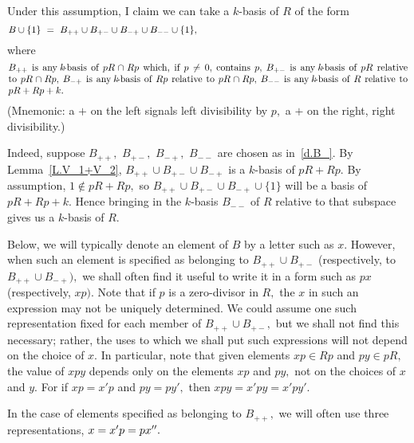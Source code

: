 \documentclass{amsart}
\begin{document}
Under this assumption,
I claim we can take a $\!k\!$-basis of $R$ of the form
\begin{equation}\begin{minipage}[c]{35pc}\label{d.B=}
$B\cup\{1\}\ =\ B_{++}\cup B_{+-} \cup B_{-+}\cup B_{--}\cup \{1\},$
\end{minipage}\end{equation}
where
\begin{equation}\begin{minipage}[c]{35pc}\label{d.B_}
$B_{++}$ is any $\!k\!$-basis of $pR\cap Rp$ which,
if $p\neq 0,$ contains $p,$

$B_{+-}$ is any $\!k\!$-basis of $pR$ relative to $pR\cap Rp,$

$B_{-+}$ is any $\!k\!$-basis of $Rp$ relative to $pR\cap Rp,$

$B_{--}$ is any $\!k\!$-basis of $R$ relative to $pR+Rp+k.$
\end{minipage}\end{equation}
(Mnemonic: a $+$ on the left signals left divisibility
by $p,$ a $+$ on the right, right divisibility.)

Indeed, suppose $B_{++},$ $B_{+-},$ $B_{-+},$ $B_{--}$ are chosen
as in~\eqref{d.B_}.
By Lemma~\ref{L.V_1+V_2}, $B_{++}\cup B_{+-} \cup B_{-+}$
is a $\!k\!$-basis of $pR+Rp.$
By assumption, $1\notin pR+Rp,$ so
$B_{++}\cup B_{+-} \cup B_{-+}\cup\{1\}$ will be a
basis of $pR+Rp+k.$
Hence bringing in the $\!k\!$-basis $B_{--}$ of $R$ relative
to that subspace gives us a $\!k\!$-basis of $R.$

Below, we will typically denote an element of $B$ by a
letter such as $x.$
However, when such an element is specified as belonging to
$B_{++}\cup B_{+-}$ (respectively, to $B_{++}\cup B_{-+}),$
we shall often find it useful to write it in a form such as $px$
(respectively, $xp).$
Note that if $p$ is a zero-divisor in $R,$ the $x$ in
such an expression may not be uniquely determined.
We could assume one such representation fixed for each
member of $B_{++}\cup B_{+-},$ but we shall
not find this necessary; rather, the uses to which we shall
put such expressions will not depend on the choice of $x.$
In particular, note that given elements $xp\in Rp$ and $py\in pR,$ the
value of $xpy$ depends only on the elements $xp$ and $py,$ not
on the choices of $x$ and $y.$
For if $xp=x'p$ and $py=py',$ then $xpy=x'py=x'py'.$

In the case of elements specified as belonging
to $B_{++},$ we will often use three representations,
$x=x'p=\nolinebreak px''.$
\end{document}
